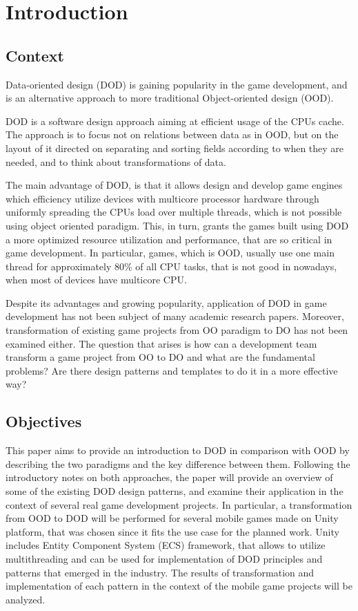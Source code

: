 \chapter{Introduction}
\label{chap:intro}


\section{Context}
\label{sec:context}
Data-oriented design (DOD) is gaining popularity in the game development, and is an alternative approach to more traditional Object-oriented design (OOD). 

DOD is a software design approach aiming at efficient usage of the CPUs cache. The approach is to focus not on relations between data as in OOD, but on the layout of it directed on separating and sorting fields according to when they are needed, and to think about transformations of data.

The main advantage of DOD, is that it allows design and develop  game engines which efficiency utilize devices with multicore processor hardware through uniformly spreading the CPUs load over multiple threads, which is not possible using object oriented paradigm. This, in turn, grants the games built using DOD a more optimized resource utilization and performance, that are so critical in game development. In particular, games, which is OOD,  usually use one main thread for approximately  80\% of all CPU tasks, that is not good in nowadays, when most of devices have multicore CPU.

Despite its advantages and growing popularity, application of DOD in game development has not been subject of many academic research papers. Moreover, transformation of existing game projects from OO paradigm to DO has not been examined either. The question that arises is how can a development team transform a game project from OO to DO and what are the fundamental problems? Are there design patterns and templates to do it in a more effective way?

\section{Objectives}
\label{sec:objectives}

This paper aims to provide an introduction to DOD in comparison with OOD by describing the two paradigms and the key difference between them. Following the introductory notes on both approaches, the paper will provide an overview of some of the existing DOD design patterns, and examine their application in the context of several real game development projects. In particular, a transformation from OOD to DOD will be performed for several mobile games made on Unity platform, that was chosen since it fits the use case for the planned work. Unity includes Entity Component System (ECS) framework, that allows to utilize multithreading and can be used for implementation of DOD principles and patterns that emerged in the industry. The results of transformation and implementation of each pattern in the context of the mobile game projects will be analyzed. 

